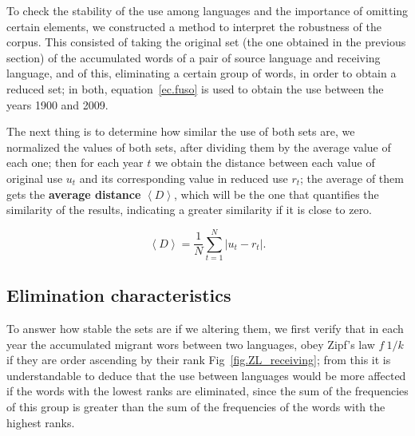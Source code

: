\documentclass[10pt,letterpaper]{article} %
\begin{document}
To check the stability of the use among languages and the importance of omitting certain elements, we constructed a method to interpret the robustness of the corpus. This consisted of taking the original set (the one obtained in the previous section) of the accumulated words of a pair of source language and receiving language, and of this, eliminating a certain group of words, in order to obtain a reduced set; in both,  equation~\ref{ec.fuso} is used to obtain the use between the years 1900 and 2009.

The next thing is to determine how similar the use of both sets are, we normalized the values of both sets, after dividing them by the average value of each one; then for each year $t$ we obtain the distance between each value of original use $u_{t}$ and its corresponding value in reduced use $r_{t}$; the average of them gets the \textbf{average distance} $\left\langle D \right\rangle$, which will be the one that quantifies the similarity of the results, indicating a greater similarity if it is close to zero.

\begin{equation}
\left\langle D \right\rangle  = \frac{1}{N}\sum_{t=1}^{N} \left| u_{t} - r_{t} \right|  .
\label{ec.Davg}
\end{equation}

\subsection*{Elimination characteristics}

To answer how stable the sets are if we altering them, we first verify that in each year the accumulated migrant wors between two languages, obey Zipf's law $f~1/k$ if they are order ascending by their rank Fig~\ref{fig.ZL_receiving}; from this it is understandable to deduce that the use between languages would be more affected if the words with the lowest ranks are eliminated, since the sum of the frequencies of this group is greater than the sum of the frequencies of the words with the highest ranks.
\end{document}
